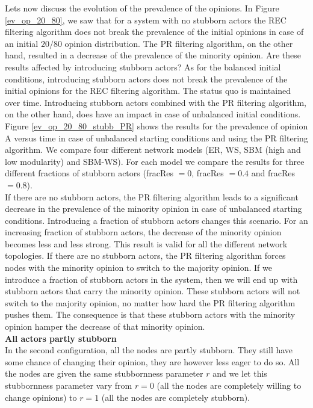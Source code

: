 \documentclass[11 pt , letterpaper , twoside , openright]{book}
\begin{document}
\noindent
Lets now discuss the evolution of the prevalence of the opinions. In Figure \ref{ev_op_20_80}, we saw that for a system with no stubborn actors the REC filtering algorithm does not break the prevalence of the initial opinions in case of an initial $20/80$ opinion distribution. The PR filtering algorithm, on the other hand, resulted in a decrease of the prevalence of the minority opinion. Are these results affected by introducing stubborn actors? As for the balanced initial conditions, introducing stubborn actors does not break the prevalence of the initial opinions for the REC filtering algorithm. The status quo is maintained over time. Introducing stubborn actors combined with the PR filtering algorithm, on the other hand, does have an impact in case of unbalanced initial conditions.\\
\newline
Figure \ref{ev_op_20_80_stubb_PR} shows the results for the prevalence of opinion A versus time in case of unbalanced starting conditions and using the PR filtering algorithm. We compare four different network models (ER, WS, SBM (high and low modularity) and SBM-WS). For each model we compare the results for three different fractions of stubborn actors (fracRes $=0$, fracRes $=0.4$ and fracRes $=0.8$). \\
\newline
If there are no stubborn actors, the PR filtering algorithm leads to a significant decrease in the prevalence of the minority opinion in case of unbalanced starting conditions. Introducing a fraction of stubborn actors changes this scenario. For an increasing fraction of stubborn actors, the decrease of the minority opinion becomes less and less strong. This result is valid for all the different network topologies. If there are no stubborn actors, the PR filtering algorithm forces nodes with the minority opinion to switch to the majority opinion. If we introduce a fraction of stubborn actors in the system, then we will end up with stubborn actors that carry the minority opinion. These stubborn actors will not switch to the majority opinion, no matter how hard the PR filtering algorithm pushes them. The consequence is that these stubborn actors with the minority opinion hamper the decrease of that minority opinion. \\
\newline
\textbf{All actors partly stubborn}\\
\newline
In the second configuration, all the nodes are partly stubborn. They still have some chance of changing their opinion, they are however less eager to do so. All the nodes are given the same stubbornness parameter $r$ and we let this stubbornness parameter vary from $r = 0$ (all the nodes are completely willing to change opinions) to $r=1$ (all the nodes are completely stubborn).\\
\end{document}
